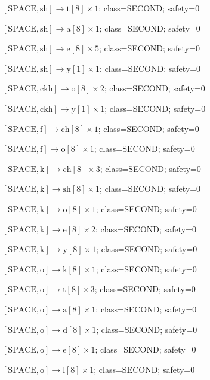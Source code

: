 \(\left[\mathrm{SPACE}, \mathrm{sh}\right] \to \mathrm{t}[8] \times 1\); class=SECOND; safety=0\par
\(\left[\mathrm{SPACE}, \mathrm{sh}\right] \to \mathrm{a}[8] \times 1\); class=SECOND; safety=0\par
\(\left[\mathrm{SPACE}, \mathrm{sh}\right] \to \mathrm{e}[8] \times 5\); class=SECOND; safety=0\par
\(\left[\mathrm{SPACE}, \mathrm{sh}\right] \to \mathrm{y}[1] \times 1\); class=SECOND; safety=0\par
\(\left[\mathrm{SPACE}, \mathrm{ckh}\right] \to \mathrm{o}[8] \times 2\); class=SECOND; safety=0\par
\(\left[\mathrm{SPACE}, \mathrm{ckh}\right] \to \mathrm{y}[1] \times 1\); class=SECOND; safety=0\par
\(\left[\mathrm{SPACE}, \mathrm{f}\right] \to \mathrm{ch}[8] \times 1\); class=SECOND; safety=0\par
\(\left[\mathrm{SPACE}, \mathrm{f}\right] \to \mathrm{o}[8] \times 1\); class=SECOND; safety=0\par
\(\left[\mathrm{SPACE}, \mathrm{k}\right] \to \mathrm{ch}[8] \times 3\); class=SECOND; safety=0\par
\(\left[\mathrm{SPACE}, \mathrm{k}\right] \to \mathrm{sh}[8] \times 1\); class=SECOND; safety=0\par
\(\left[\mathrm{SPACE}, \mathrm{k}\right] \to \mathrm{o}[8] \times 1\); class=SECOND; safety=0\par
\(\left[\mathrm{SPACE}, \mathrm{k}\right] \to \mathrm{e}[8] \times 2\); class=SECOND; safety=0\par
\(\left[\mathrm{SPACE}, \mathrm{k}\right] \to \mathrm{y}[8] \times 1\); class=SECOND; safety=0\par
\(\left[\mathrm{SPACE}, \mathrm{o}\right] \to \mathrm{k}[8] \times 1\); class=SECOND; safety=0\par
\(\left[\mathrm{SPACE}, \mathrm{o}\right] \to \mathrm{t}[8] \times 3\); class=SECOND; safety=0\par
\(\left[\mathrm{SPACE}, \mathrm{o}\right] \to \mathrm{a}[8] \times 1\); class=SECOND; safety=0\par
\(\left[\mathrm{SPACE}, \mathrm{o}\right] \to \mathrm{d}[8] \times 1\); class=SECOND; safety=0\par
\(\left[\mathrm{SPACE}, \mathrm{o}\right] \to \mathrm{e}[8] \times 1\); class=SECOND; safety=0\par
\(\left[\mathrm{SPACE}, \mathrm{o}\right] \to \mathrm{l}[8] \times 1\); class=SECOND; safety=0\par

